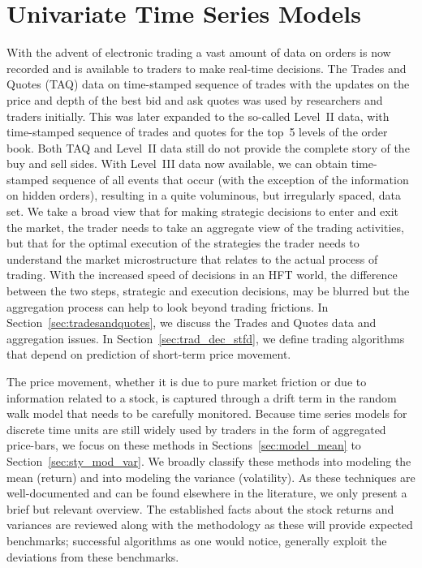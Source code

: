 \chapter{Univariate Time Series Models\label{ch:ch_uvts}} \label{in:tsm1}

With the advent of electronic trading a vast amount of data on orders is now recorded and is available to traders to make real-time decisions. The Trades and Quotes (TAQ)\label{in:taq1} data on time-stamped sequence of trades with the updates on the price and depth of the best bid and ask quotes was used by researchers and traders initially. This was later expanded to the so-called Level~II data, with time-stamped sequence of trades and quotes for the top~5 levels of the order book. Both TAQ and Level~II data still do not provide the complete story of the buy and sell sides. With Level~III data now available, we can obtain time-stamped sequence of all events that occur (with the exception of the information on hidden orders), resulting in a quite voluminous, but irregularly spaced, data set. We take a broad view that for making strategic decisions to enter and exit the market, the trader needs to take an aggregate view of the trading activities, but that for the optimal execution of the strategies the trader needs to understand the market microstructure that relates to the actual process of trading. With the increased speed of decisions in an HFT world, the difference between the two steps, strategic and execution decisions, may be blurred but the aggregation process can help to look beyond trading frictions. In Section~\ref{sec:tradesandquotes}, we discuss the Trades and Quotes data and aggregation issues. In Section~\ref{sec:trad_dec_stfd}, we define trading algorithms that depend on prediction of short-term price movement.


The price movement, whether it is due to pure market friction or due to information related to a stock, is captured through a drift term in the random walk model that needs to be carefully monitored. Because time series models for discrete time units are still widely used by traders in the form of aggregated price-bars, we focus on these methods in Sections~\ref{sec:model_mean} to Section~\ref{sec:sty_mod_var}. We broadly classify these methods into modeling the mean (return) and into modeling the variance (volatility). As these techniques are well-documented and can be found elsewhere in the literature, we only present a brief but relevant overview. The established facts about the stock returns and variances are reviewed along with the methodology as these will provide expected benchmarks; successful algorithms as one would notice, generally exploit the deviations from these benchmarks.



